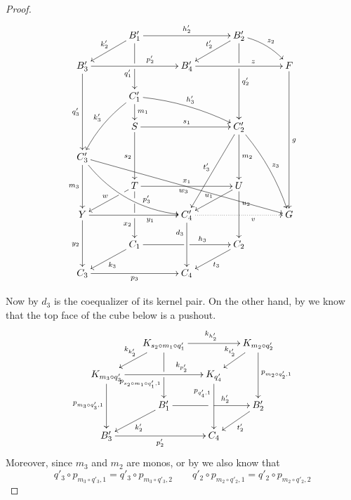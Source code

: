 \begin{proof}
\[\xymatrix@C=35pt@R=15pt{& B'_1 \ar[dd]|(.5)\hole_(.62){q'_1}\ar[rr]^{h'_2} \ar[dl]_{k'_2} && B'_2 \ar[ddd]|(.33)\hole^{q'_2} \ar[dl]_{t'_2} \ar@/^.2cm/[dr]^{z_2}\\B'_3 \ar[ddd]_{q'_3} \ar[rr]^(.65){p'_2} && B'_4  \ar[rr]^(.65){z}&& F \ar[ddddd]^{g}\\& C'_1 \ar@/^.2cm/[drr]^{h'_3} \ar@/_.2cm/[ddl]_{k'_3} \ar[d]^{m_1}\\& S \ar[rr]^{s_1} \ar[dd]_{s_2} && C'_2 \ar[dd]^{m_2} \ar@/^.2cm/[dddr]^{z_3} \ar[lddd]_{t'_3}\\ C'_3 \ar@/_.5cm/[ddrr]^(.65){p'_3} \ar[ddrrrr]_{w_3} \ar[dd]_{m_3}\\&T\ar[dd]|(.25)\hole|\hole_(.65){x_2}\ar[rr]^{x_1} \ar[dl]|(.25)\hole_{w} && U \ar[dd]^(.3){u_2} \ar[dl]_{u_1} \\ Y  \ar[dd]_{y_2}\ar[rr]_(.65){y_1} & & C'_4 \ar@{.>}[rr]_(.65){v} \ar[dd]_(.3){d_3} && G\\&C_1\ar[rr]|\hole^(.65){h_3} \ar[dl]^{k_3} && C_2 \ar[dl]^{t_3} \\C_3 \ar[rr]_{p_3} & & C_4}\]


Now by  $d_3$ is the coequalizer of its kernel pair. On the other hand, by   we know that the top face of the cube below is a pushout.
\[\xymatrix@C=15pt@R=15pt{&K_{s_2\circ m_1\circ q'_1}\ar[dd]|\hole_(.65){p_{s_2\circ m_1\circ q'_1,1}}\ar[rr]^{k_{h'_2}} \ar[dl]_{k_{k'_2}} && K_{m_2\circ q'_2} \ar[dd]^{p_{m_2\circ q'_2,1}} \ar[dl]_{k_{t'_2}} \\ K_{m_3\circ q'_3}  \ar[dd]_{p_{m_3\circ q'_3,1}}\ar[rr]^(.7){k_{p'_2}} & & K_{q'_4} \ar[dd]_(.3){p_{q'_4,1}}\\&B'_1\ar[rr]|\hole^(.65){h'_2} \ar[dl]^{k'_2} && B'_2 \ar[dl]^{t'_2} \\B'_3 \ar[rr]_{p'_2} & & C_4}\]
Moreover, since $m_3$ and $m_2$ are monos, or by  we also know that
\[q'_3\circ p_{m_3\circ q'_3, 1}  = q'_3\circ p_{m_3\circ q'_3,2} \qquad q'_2\circ p_{m_2\circ q'_2, 1}  = q'_2\circ p_{m_2\circ q'_2,2}\]


\end{proof}
